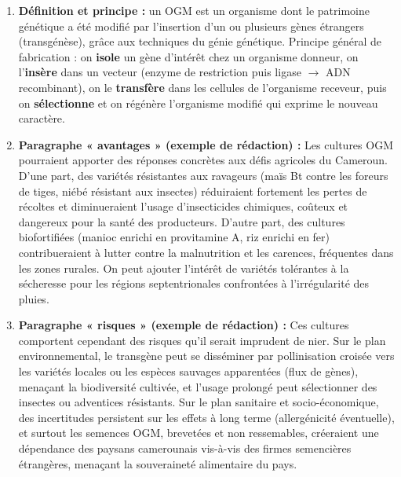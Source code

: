 \documentclass[11pt]{article}
\begin{document}
\begin{corrige}
\begin{enumerate}
\item \textbf{Définition et principe :} un OGM est un organisme dont le patrimoine génétique a été modifié par l'insertion d'un ou plusieurs gènes étrangers (transgénèse), grâce aux techniques du génie génétique. Principe général de fabrication : on \textbf{isole} un gène d'intérêt chez un organisme donneur, on l'\textbf{insère} dans un vecteur (enzyme de restriction puis ligase $\rightarrow$ ADN recombinant), on le \textbf{transfère} dans les cellules de l'organisme receveur, puis on \textbf{sélectionne} et on régénère l'organisme modifié qui exprime le nouveau caractère.
\item \textbf{Paragraphe « avantages » (exemple de rédaction) :} Les cultures OGM pourraient apporter des réponses concrètes aux défis agricoles du Cameroun. D'une part, des variétés résistantes aux ravageurs (maïs Bt contre les foreurs de tiges, niébé résistant aux insectes) réduiraient fortement les pertes de récoltes et diminueraient l'usage d'insecticides chimiques, coûteux et dangereux pour la santé des producteurs. D'autre part, des cultures biofortifiées (manioc enrichi en provitamine A, riz enrichi en fer) contribueraient à lutter contre la malnutrition et les carences, fréquentes dans les zones rurales. On peut ajouter l'intérêt de variétés tolérantes à la sécheresse pour les régions septentrionales confrontées à l'irrégularité des pluies.
\item \textbf{Paragraphe « risques » (exemple de rédaction) :} Ces cultures comportent cependant des risques qu'il serait imprudent de nier. Sur le plan environnemental, le transgène peut se disséminer par pollinisation croisée vers les variétés locales ou les espèces sauvages apparentées (flux de gènes), menaçant la biodiversité cultivée, et l'usage prolongé peut sélectionner des insectes ou adventices résistants. Sur le plan sanitaire et socio-économique, des incertitudes persistent sur les effets à long terme (allergénicité éventuelle), et surtout les semences OGM, brevetées et non ressemables, créeraient une dépendance des paysans camerounais vis-à-vis des firmes semencières étrangères, menaçant la souveraineté alimentaire du pays.

\end{enumerate}
\end{corrige}
\end{document}
